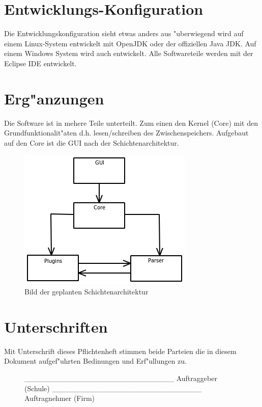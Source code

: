 \documentclass[a4paper,11pt,abstracton,titlepage]{scrartcl}
\begin{document}
\section{Entwicklungs-Konfiguration}
Die Entwicklungskonfiguration sieht etwas anders aus "uberwiegend wird auf einem Linux-System entwickelt mit OpenJDK oder der offiziellen Java\footnotesize{\texttrademark} \normalsize JDK.
Auf einem Windows System wird auch entwickelt. Alle Softwareteile werden mit der Eclipse IDE entwickelt. 
\section{Erg"anzungen}
Die Software ist in mehere Teile unterteilt. Zum einen den Kernel (Core) mit den Grundfunktionalit"aten d.h. lesen/schreiben des Zwischenspeichers. Aufgebaut auf den Core ist die GUI nach der Schichtenarchitektur. \newline
\begin{figure}[htbp]
\centering
\includegraphics[scale=0.7]{Schichtenarchitektur}
\caption{Bild der geplanten Schichtenarchitektur}
\end{figure}
\newpage
\section{Unterschriften}
Mit Unterschrift dieses Pflichtenheft stimmen beide Parteien die in diesem Dokument aufgef"uhrten Bedinungen und Erf"ullungen zu. 
\newline\newline
\begin{figure}[htdp]
\_\_\_\_\_\_\_\_\_\_\_\_\_\_\_\_\_\_\_\_\_\_\_\_\_\_\_\_\newline
Auftraggeber (Schule) \newline
\newline\newline
\_\_\_\_\_\_\_\_\_\_\_\_\_\_\_\_\_\_\_\_\_\_\_\_\_\_\_\_\newline
Auftragnehmer (Firm)\newline
\end{figure}
\end{document}
